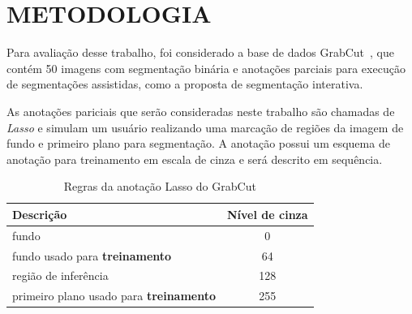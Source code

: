 \chapter{METODOLOGIA}\label{cap:metodologia}

Para avaliação desse trabalho, foi considerado a base de dados
GrabCut~\cite{rother2004grabcut}, que contém 50 imagens com segmentação
binária e anotações parciais para execução de segmentações assistidas,
como a proposta de segmentação interativa.

As anotações pariciais que serão consideradas neste trabalho são
chamadas de \textit{Lasso} e simulam um usuário realizando uma
marcação de regiões da imagem de fundo e primeiro plano para
segmentação. A anotação possui um esquema de anotação para treinamento
em escala de cinza e será descrito em sequência.

\begin{figure}[h!]
        \captionsetup{width=12cm}
		\centering
\end{figure}
\FloatBarrier{}

\begin{table}[h]
  \centering
  \caption{Regras da anotação Lasso do GrabCut}
  \label{tab:grabcut-label}
  \begin{tabular}{lc}
    \toprule
    Descrição                                       & Nível de cinza \\
    \midrule \midrule
     fundo                                          & 0              \\
     fundo usado para \textbf{treinamento}          & 64             \\
     região de inferência                           & 128            \\
     primeiro plano usado para \textbf{treinamento} & 255            \\
    \bottomrule
  \end{tabular}
\end{table}


